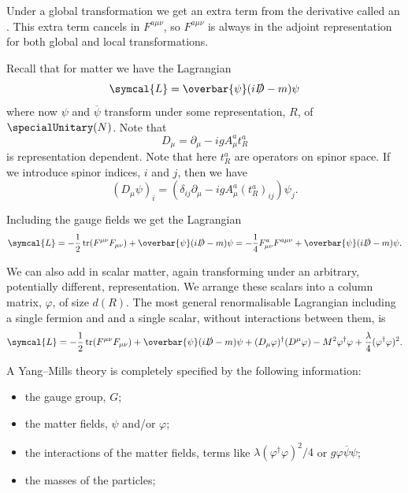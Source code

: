 \documentclass[fleqn]{NotesClass}
\newcommand{\diracadjoint}[1]{\overbar{#1}}
\newcommand{\covariantDerivative}{D}
\newcommand{\hermit}{\dagger}
\newcommand{\lagrangianDensity}{\symcal{L}}
\DeclareMathOperator{\tr}{tr}
\begin{document}
    Under a global transformation we get an extra term from the derivative called an .
    This extra term cancels in \(F^{a\mu\nu}\), so \(F^{a\mu\nu}\) is always in the adjoint representation for both global and local transformations.
    
    Recall that for matter we have the Lagrangian
    \begin{equation}
        \lagrangianDensity = \diracadjoint{\psi} (i\slashed{\covariantDerivative} - m) \psi
    \end{equation}
    where now \(\psi\) and \(\diracadjoint{\psi}\) transform under some representation, \(R\), of \(\specialUnitary(N)\).
    Note that
    \begin{equation}
        \covariantDerivative_\mu = \partial_\mu - igA^a_\mu t_R^a
    \end{equation}
    is representation dependent.
    Note that here \(t_R^a\) are operators on spinor space.
    If we introduce spinor indices, \(i\) and \(j\), then we have
    \begin{equation}
        (\covariantDerivative_\mu\psi)_i = (\delta_{ij}\partial_\mu - igA^a_\mu(t_R^a)_{ij})\psi_j.
    \end{equation}
    
    Including the gauge fields we get the Lagrangian
    \begin{equation}
        \lagrangianDensity = -\frac{1}{2}\tr(F^{\mu\nu}F_{\mu\nu}) + \diracadjoint{\psi}(i \slashed{\covariantDerivative} - m) \psi = -\frac{1}{4}F^a_{\mu\nu}F^{a\mu\nu} + \diracadjoint{\psi}(i\slashed{\covariantDerivative} - m)\psi.
    \end{equation}
    
    We can also add in scalar matter, again transforming under an arbitrary, potentially different, representation.
    We arrange these scalars into a column matrix, \(\varphi\), of size \(d(R)\).
    The most general renormalisable Lagrangian including a single fermion and and a single scalar, without interactions between them, is
    \begin{equation}
        \lagrangianDensity = -\frac{1}{2}\tr(F^{\mu\nu}F_{\mu\nu}) + \diracadjoint{\psi}(i \slashed{\covariantDerivative} - m) \psi + (\covariantDerivative_\mu \varphi)^\hermit (\covariantDerivative^\mu \varphi) - M^2 \varphi^\hermit \varphi + \frac{\lambda}{4}(\varphi^\hermit \varphi)^2.
    \end{equation}
    
    A Yang--Mills theory is completely specified by the following information:
    \begin{itemize}
        \item the gauge group, \(G\);
        \item the matter fields, \(\psi\) and/or \(\varphi\);
        \item the interactions of the matter fields, terms like \(\lambda(\varphi^\hermit \varphi)^2/4\) or \(g\varphi\diracadjoint{\psi}\psi\);
        \item the masses of the particles;
    \end{itemize}
    
\end{document}
